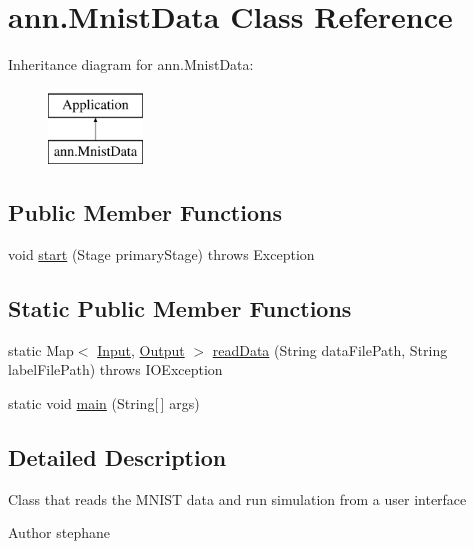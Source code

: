 \hypertarget{classann_1_1_mnist_data}{}\section{ann.\+Mnist\+Data Class Reference}
\label{classann_1_1_mnist_data}
Inheritance diagram for ann.\+Mnist\+Data\+:\begin{figure}[H]
\begin{center}
\leavevmode
\includegraphics[height=2.000000cm]{classann_1_1_mnist_data}
\end{center}
\end{figure}
\subsection*{Public Member Functions}
\begin{DoxyCompactItemize}
\item 
void \hyperlink{classann_1_1_mnist_data_a163423e53cf98cbc9c7517f40a1a2476}{start} (Stage primary\+Stage)  throws Exception 
\end{DoxyCompactItemize}
\subsection*{Static Public Member Functions}
\begin{DoxyCompactItemize}
\item 
static Map$<$ \hyperlink{classann_1_1_input}{Input}, \hyperlink{classann_1_1_output}{Output} $>$ \hyperlink{classann_1_1_mnist_data_af92e544d110867d6a1324bfb9ec6b3f2}{read\+Data} (String data\+File\+Path, String label\+File\+Path)  throws I\+O\+Exception 
\item 
static void \hyperlink{classann_1_1_mnist_data_a927889494e75519b70b5364b391cb37d}{main} (String\mbox{[}$\,$\mbox{]} args)
\end{DoxyCompactItemize}


\subsection{Detailed Description}
Class that reads the M\+N\+I\+ST data and run simulation from a user interface

\begin{DoxyAuthor}{Author}
stephane 
\end{DoxyAuthor}


